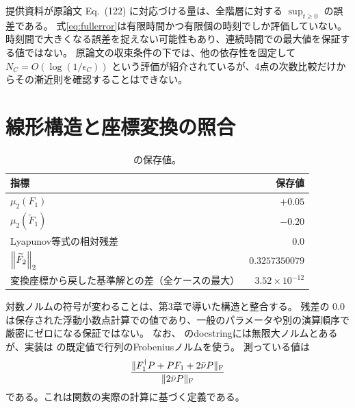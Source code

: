 提供資料が原論文 Eq.~(122) に対応づける量は、全階層に対する $\sup_{t\geq0}$ の誤差である。
式\eqref{eq:fullerror}は有限時間かつ有限個の時刻でしか評価していない。
時刻間で大きくなる誤差を捉えない可能性もあり、連続時間での最大値を保証する値ではない。
原論文の収束条件の下では、他の依存性を固定して $N_C=O(\log(1/\epsilon_C))$ という評価が紹介されているが、4点の次数比較だけからその漸近則を確認することはできない。

\section{線形構造と座標変換の照合}
\begin{table}[htbp]
\centering
\caption{ の保存値。}
\begin{tabularx}{\textwidth}{Xr}
\toprule 指標 & 保存値 \\\midrule
$\mu_2(F_1)$ & $+0.05$\\
$\mu_2(\widetilde F_1)$ & $-0.20$\\
Lyapunov等式の相対残差 & $0.0$\\
$\left\lVert \widetilde F_2\right\rVert_2$ & $0.3257350079$\\
変換座標から戻した基準解との差（全ケースの最大） & $3.52\times10^{-12}$\\
\bottomrule
\end{tabularx}
\end{table}
対数ノルムの符号が変わることは、第3章で導いた構造と整合する。
残差の $0.0$ は保存された浮動小数点計算での値であり、一般のパラメータや別の演算順序で厳密にゼロになる保証ではない。
なお、 のdocstringには無限大ノルムとあるが、実装は  の既定値で行列のFrobeniusノルムを使う。
測っている値は
\[
\frac{\|F_1^\dagger P+PF_1+2\bar\nu P\|_{\mathrm F}}{\|2\bar\nu P\|_{\mathrm F}}
\]
である。これは関数の実際の計算に基づく定義である。

